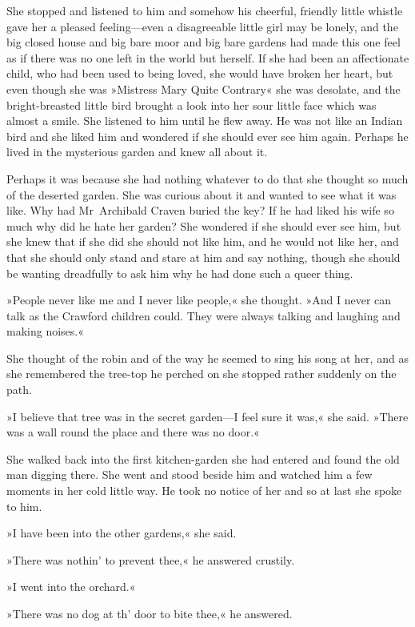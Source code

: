 She stopped and listened to him and somehow his cheerful, friendly little whistle gave her a pleased feeling—even a disagreeable little girl may be lonely, and the big closed house and big bare moor and big bare gardens had made this one feel as if there was no one left in the world but herself. If she had been an affectionate child, who had been used to being loved, she would have broken her heart, but even though she was »Mistress Mary Quite Contrary« she was desolate, and the bright-breasted little bird brought a look into her sour little face which was almost a smile. She listened to him until he flew away. He was not like an Indian bird and she liked him and wondered if she should ever see him again. Perhaps he lived in the mysterious garden and knew all about it.

Perhaps it was because she had nothing whatever to do that she thought so much of the deserted garden. She was curious about it and wanted to see what it was like. Why had Mr~Archibald Craven buried the key? If he had liked his wife so much why did he hate her garden? She wondered if she should ever see him, but she knew that if she did she should not like him, and he would not like her, and that she should only stand and stare at him and say nothing, though she should be wanting dreadfully to ask him why he had done such a queer thing.

»People never like me and I never like people,« she thought. »And I never can talk as the Crawford children could. They were always talking and laughing and making noises.«

She thought of the robin and of the way he seemed to sing his song at her, and as she remembered the tree-top he perched on she stopped rather suddenly on the path.

»I believe that tree was in the secret garden—I feel sure it was,« she said. »There was a wall round the place and there was no door.«

She walked back into the first kitchen-garden she had entered and found the old man digging there. She went and stood beside him and watched him a few moments in her cold little way. He took no notice of her and so at last she spoke to him.

»I have been into the other gardens,« she said.

»There was nothin' to prevent thee,« he answered crustily.

»I went into the orchard.«

»There was no dog at th' door to bite thee,« he answered.

